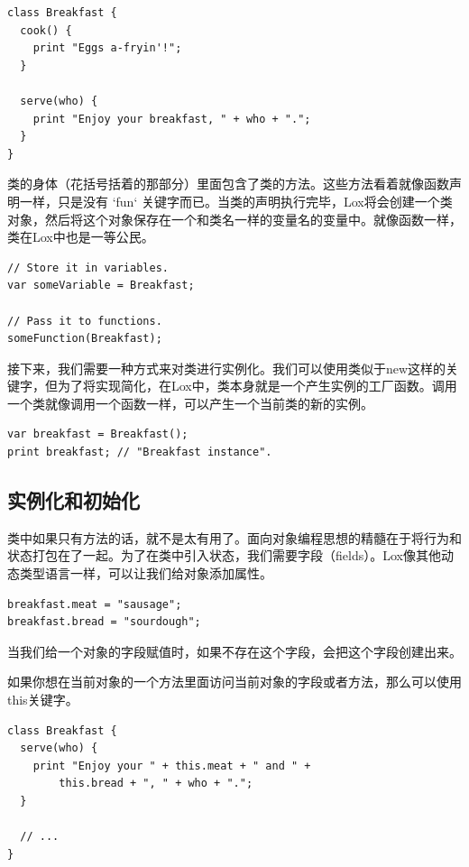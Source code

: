 \documentclass[cn,10pt,math=newtx,citestyle=gb7714-2015,bibstyle=gb7714-2015]{elegantbook}
\begin{document}
\begin{verbatim}
class Breakfast {
  cook() {
    print "Eggs a-fryin'!";
  }

  serve(who) {
    print "Enjoy your breakfast, " + who + ".";
  }
}
\end{verbatim}

类的身体（花括号括着的那部分）里面包含了类的方法。这些方法看着就像函数声明一样，只是没有 `fun` 关键字而已。当类的声明执行完毕，Lox将会创建一个类对象，然后将这个对象保存在一个和类名一样的变量名的变量中。就像函数一样，类在Lox中也是一等公民。

\begin{verbatim}
// Store it in variables.
var someVariable = Breakfast;

// Pass it to functions.
someFunction(Breakfast);
\end{verbatim}

接下来，我们需要一种方式来对类进行实例化。我们可以使用类似于new这样的关键字，但为了将实现简化，在Lox中，类本身就是一个产生实例的工厂函数。调用一个类就像调用一个函数一样，可以产生一个当前类的新的实例。

\begin{verbatim}
var breakfast = Breakfast();
print breakfast; // "Breakfast instance".
\end{verbatim}

\subsection{实例化和初始化}

类中如果只有方法的话，就不是太有用了。面向对象编程思想的精髓在于将行为和状态打包在了一起。为了在类中引入状态，我们需要字段（fields）。Lox像其他动态类型语言一样，可以让我们给对象添加属性。

\begin{verbatim}
breakfast.meat = "sausage";
breakfast.bread = "sourdough";
\end{verbatim}

当我们给一个对象的字段赋值时，如果不存在这个字段，会把这个字段创建出来。

如果你想在当前对象的一个方法里面访问当前对象的字段或者方法，那么可以使用this关键字。

\begin{verbatim}
class Breakfast {
  serve(who) {
    print "Enjoy your " + this.meat + " and " +
        this.bread + ", " + who + ".";
  }

  // ...
}
\end{verbatim}
\end{document}
